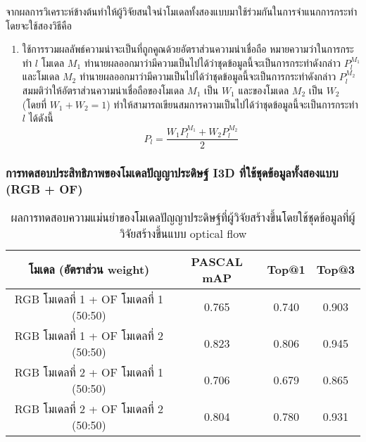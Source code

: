 จากผลการวิเคราะห์ข้างต้นทำให้ผู้วิจัยสนใจนำโมเดลทั้งสองแบบมาใช้ร่วมกันในการจำแนกการกระทำ โดยจะใช้สองวิธีคือ
\begin{enumerate}
	\item ใช้การรวมผลลัพธ์ความน่าจะเป็นที่ถูกคูณด้วยอัตราส่วนความน่าเชื่อถือ
	หมายความว่าในการกระทำ $l$ โมเดล $M_1$ ทำนายผลออกมาว่ามีความเป็นไปได้ว่าชุดข้อมูลนี้จะเป็นการกระทำดังกล่าว $P_l^{M_1}$ 
	และโมเดล $M_2$ ทำนายผลออกมาว่ามีความเป็นไปได้ว่าชุดข้อมูลนี้จะเป็นการกระทำดังกล่าว $P_l^{M_2}$ สมมติว่าให้อัตราส่วนความน่าเชื่อถือของโมเดล $M_1$ เป็น $W_1$
	และของโมเดล $M_2$ เป็น $W_2$ (โดยที่ $W_1 + W_2 = 1$) ทำให้สามารถเขียนสมการความเป็นไปได้ว่าชุดข้อมูลนี้จะเป็นการกระทำ $l$ ได้ดังนี้
	\begin{equation}
		P_l = \frac{W_1 P_l^{M_1} + W_2 P_l^{M_2}}{2}
	\end{equation}
\end{enumerate}
\subsubsection{การทดสอบประสิทธิภาพของโมเดลปัญญาประดิษฐ์ I3D ที่ใช้ชุดข้อมูลทั้งสองแบบ (RGB + OF)}
\begin{table}[!ht]
	\centering
	\begin{tabular}{|c|c|c|c|}
			\hline
			{โมเดล (อัตราส่วน weight)}	&	{PASCAL mAP}	&	{Top@1}	&	{Top@3}\\
			\hline
			RGB โมเดลที่ 1 + OF โมเดลที่ 1 (50:50)	& 0.765	& 0.740	& 0.903	\\
			RGB โมเดลที่ 1 + OF โมเดลที่ 2 (50:50)	& 0.823	& 0.806	& 0.945	\\
			RGB โมเดลที่ 2 + OF โมเดลที่ 1 (50:50)	& 0.706	& 0.679	& 0.865	\\
			RGB โมเดลที่ 2 + OF โมเดลที่ 2 (50:50)	& 0.804	& 0.780	& 0.931	\\
			\hline
	\end{tabular}
\caption{ผลการทดสอบความแม่นยำของโมเดลปัญญาประดิษฐ์ที่ผู้วิจัยสร้างขึ้นโดยใช้ชุดข้อมูลที่ผู้วิจัยสร้างขึ้นแบบ optical flow}
\label{tab:I3D_OP_performance}
\end{table}

